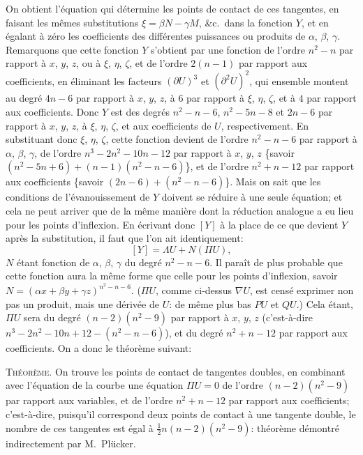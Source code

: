 \documentclass[11pt]{article}
\begin{document}
\medskip
On obtient l'\'equation qui d\'etermine les points de contact de ces tangentes, en
faisant les m\^emes substitutions $\xi = \beta N - \gamma M$, \&c.\ dans la fonction $Y$, et en \'egalant \`a
z\'ero les coefficients des diff\'erentes puissances ou produits de $\alpha$, $\beta$, $\gamma$. Remarquons que
cette fonction $Y$ s'obtient par une fonction de l'ordre $n^{2} - n$ par rapport \`a $x$, $y$, $z$,
ou \`a $\xi$, $\eta$, $\zeta$, et de l'ordre $2(n - 1)$ par rapport aux coefficients, en \'eliminant les
facteurs $(\partial U)^{3}$ et $(\partial^{2} U)^{2}$, qui ensemble montent au degr\'e $4n - 6$ par rapport \`a $x$, $y$, $z$,
\`a $6$ par rapport \`a $\xi$, $\eta$, $\zeta$, et \`a $4$ par rapport aux coefficients. Donc $Y$ est des degr\'es
$n^{2} - n - 6$, $n^{2} - 5 n - 8$ et $2 n - 6$ par rapport \`a $x$, $y$, $z$, \`a $\xi$, $\eta$, $\zeta$, et aux coefficients de $U$,
respectivement. En substituant donc $\xi$, $\eta$, $\zeta$, cette fonction devient de l'ordre $n^{2} - n - 6$
par rapport \`a $\alpha$, $\beta$, $\gamma$, de l'ordre $n^{3} - 2 n^{2} - 10 n - 12$ par rapport \`a $x$, $y$, $z$ \{savoir
$(n^{2} - 5 n + 6) + (n - 1)(n^{2} - n - 6)$\}, et de l'ordre $n^{2} + n - 12$ par rapport aux coefficients
\{savoir $(2 n - 6) + (n^{2} - n - 6)$\}. Mais on sait que les conditions de l'\'evanouissement de
$Y$ doivent se r\'eduire \`a une seule \'equation; et cela ne peut arriver que de la m\^eme
mani\`ere dont la r\'eduction analogue a eu lieu pour les points d'inflexion. En \'ecrivant
donc $[Y]$ \`a la place de ce que devient $Y$ apr\`es la substitution, il faut que l'on ait
identiquement:
\[
[Y] = \Lambda U + N(\Pi U),
\]
$N$ \'etant fonction de $\alpha$, $\beta$, $\gamma$ du degr\'e $n^{2} - n - 6$. Il para\^it de plus probable que
cette fonction aura la m\^eme forme que celle pour les points d'inflexion, savoir
$N = (\alpha x + \beta y + \gamma z)^{n^{2} - n - 6}$. ($\Pi U$, comme ci-dessus $\nabla U$, est cens\'e exprimer non pas un
produit, mais une d\'eriv\'ee de $U$: de m\^eme plus bas $P U$ et $Q U$.) Cela \'etant, $\Pi U$
sera du degr\'e $(n - 2)(n^{2} - 9)$ par rapport \`a $x$, $y$, $z$ (c'est-\`a-dire $n^{3} - 2 n^{2} - 10 n + 12
- (n^{2} - n - 6)$), et du degr\'e $n^{2} + n - 12$ par rapport aux coefficients. On a donc le
th\'eor\`eme suivant:

\medskip
\noindent\textsc{Th\'eor\`eme.} On trouve les points de contact de tangentes doubles, en combinant
avec l'\'equation de la courbe une \'equation $\Pi U = 0$ de l'ordre $(n - 2)(n^{2} - 9)$ par rapport
aux variables, et de l'ordre $n^{2} + n - 12$ par rapport aux coefficients; c'est-\`a-dire, puisqu'il
correspond deux points de contact \`a une tangente double, le nombre de ces tangentes
est \'egal \`a $\tfrac{1}{2} n(n - 2)(n^{2} - 9)$: th\'eor\`eme d\'emontr\'e indirectement par M.~Pl\"ucker.
\end{document}
